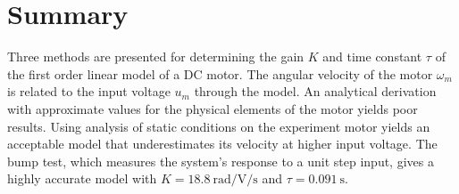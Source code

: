\section{Summary}\label{sec:summary}
Three methods are presented for determining the gain $K$ and time constant $\tau$ of the first order linear model of a DC motor.
The angular velocity of the motor $\omega_m$ is related to the input voltage $u_m$ through the model.
An analytical derivation with approximate values for the physical elements of the motor yields poor results.
Using analysis of static conditions on the experiment motor yields an acceptable model that underestimates its velocity at higher input voltage.
The bump test, which measures the system's response to a unit step input, gives a highly accurate model with $K = \SI{18.8}{\radian\per\volt\per\second}$ and $\tau = \SI{0.091}{\second}$.
